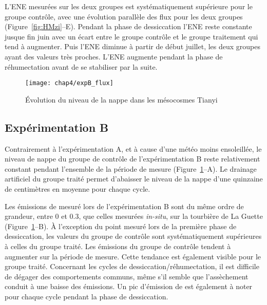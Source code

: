 
L'ENE mesurées sur les deux groupes est systématiquement supérieure pour le groupe contrôle, avec une évolution parallèle des flux pour les deux groupes (Figure~\ref{fig:HMzi}--E).
Pendant la phase de dessiccation l'ENE reste constante jusque fin juin avec un écart entre le groupe contrôle et le groupe traitement qui tend à augmenter.
Puis l'ENE diminue à partir de début juillet, les deux groupes ayant des valeurs très proches.
L'ENE augmente pendant la phase de réhumectation avant de se stabiliser par la suite.



\begin{figure}
\centering
\texttt{[image: chap4/expB\_flux]}
\caption{Évolution du niveau de la nappe dans les mésocosmes Tianyi}
\label{fig:HMty}
\end{figure}

\subsection{Expérimentation B}

Contrairement à l'expérimentation A, et à cause d'une météo moins ensoleillée, le niveau de nappe du groupe de contrôle de l'expérimentation B reste relativement constant pendant l'ensemble de la période de mesure (Figure~\ref{fig:HMty}--A).
Le drainage artificiel du groupe traité permet d'abaisser le niveau de la nappe d'une quinzaine de centimètres en moyenne pour chaque cycle.

Les émissions de \chh mesuré lors de l'expérimentation B sont du même ordre de grandeur, entre 0 et \SI{0.3}{\uml}, que celles mesurées \textit{in-situ}, sur la tourbière de La Guette (Figure~\ref{fig:HMty}--B).
À l'exception du point mesuré lors de la première phase de dessiccation, les valeurs du groupe de contrôle sont systématiquement supérieures à celles du groupe traité.
Les émissions du groupe de contrôle tendent à augmenter sur la période de mesure.
Cette tendance est également visible pour le groupe traité.
Concernant les cycles de dessiccation/réhumectation, il est difficile de dégager des comportements communs, même s'il semble que l'assèchement conduit à une baisse des émissions.
Un pic d'émission de \chh est également à noter pour chaque cycle pendant la phase de dessiccation.

